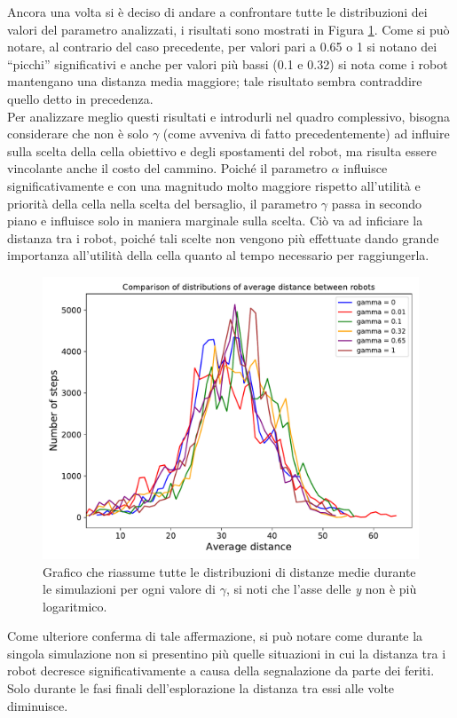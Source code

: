 Ancora una volta si è deciso di andare a confrontare tutte le distribuzioni dei valori del parametro analizzati, i risultati sono mostrati in Figura \ref{fig:gammaHComparison}.
Come si può notare, al contrario del caso precedente, per valori pari a 0.65 o 1 si notano dei “picchi” significativi e anche per valori più bassi (0.1 e 0.32) si nota come i robot mantengano una distanza media maggiore; tale risultato sembra contraddire quello detto in precedenza.\\
Per analizzare meglio questi risultati e introdurli nel quadro complessivo, bisogna considerare che non è solo $\gamma$ (come avveniva di fatto precedentemente) ad influire sulla scelta della cella obiettivo e degli spostamenti del robot, ma risulta essere vincolante anche il costo del cammino. 
Poiché il parametro $\alpha$ influisce significativamente e con una magnitudo molto maggiore rispetto all'utilità e priorità della cella nella scelta del bersaglio, il parametro $\gamma$ passa in secondo piano e influisce solo in maniera marginale sulla scelta. Ciò va ad inficiare la distanza tra i robot, poiché tali scelte non vengono più effettuate dando grande importanza all'utilità della cella quanto al tempo necessario per raggiungerla.
\begin{figure}
	\centering
	\includegraphics[width=0.9\linewidth]{images/gamma_results/high_alpha/comparison}
	\caption{Grafico che riassume tutte le distribuzioni di distanze medie durante le simulazioni per ogni valore di $\gamma$, si noti che l'asse delle \textit{y} non è più logaritmico.}
	\label{fig:gammaHComparison}
\end{figure}
Come ulteriore conferma di tale affermazione, si può notare come durante la singola simulazione non si presentino più quelle situazioni in cui la distanza tra i robot decresce significativamente a causa della segnalazione da parte dei feriti. Solo durante le fasi finali dell'esplorazione la distanza tra essi alle volte diminuisce.

